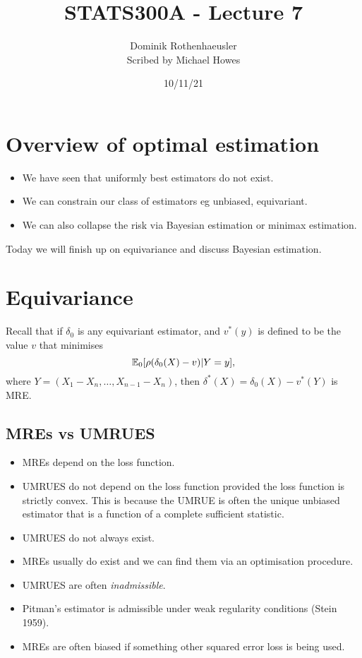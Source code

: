 




\title{STATS300A - Lecture 7}
\author{Dominik Rothenhaeusler\\ Scribed by Michael Howes}
\date{10/11/21}

\pagestyle{fancy}
\fancyhf{}


\maketitle
\tableofcontents
\section{Overview of optimal estimation}
\begin{itemize}
    \item We have seen that uniformly best estimators do not exist.
    \item We can constrain our class of estimators eg unbiased, equivariant.
    \item We can also collapse the risk via Bayesian estimation or minimax estimation.
\end{itemize}
Today we will finish up on equivariance and discuss Bayesian estimation.
\section{Equivariance}
Recall that if $\delta_0$ is any equivariant estimator, and $v^*(y)$ is defined to be the value $v$ that minimises
\[{\mathbb{E}}_0[\rho(\delta_0(X)-v)|Y=y], \]
where $Y=(X_1-X_n,\ldots,X_{n-1}-X_n)$, then $\delta^*(X) = \delta_0(X) - v^*(Y)$ is MRE.
\subsection{MREs vs UMRUES}
\begin{itemize}
    \item MREs depend on the loss function.
    \item UMRUES do not depend on the loss function provided the loss function is strictly convex. This is because the UMRUE is often the unique unbiased estimator that is a function of a complete sufficient statistic.
    \item UMRUES do not always exist.
    \item MREs usually do exist and we can find them via an optimisation procedure.
    \item UMRUES are often \emph{inadmissible}.
    \item Pitman's estimator is admissible under weak regularity conditions (Stein 1959).
    \item MREs are often biased if something other squared error loss is being used.
\end{itemize}
